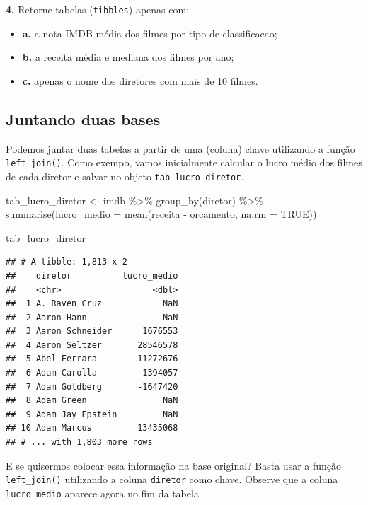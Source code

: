 \documentclass[
]{book}
\newenvironment{Shaded}{\begin{snugshade}}{\end{snugshade}}
\newcommand{\AttributeTok}[1]{\textcolor[rgb]{0.77,0.63,0.00}{#1}}
\newcommand{\ConstantTok}[1]{\textcolor[rgb]{0.00,0.00,0.00}{#1}}
\newcommand{\FunctionTok}[1]{\textcolor[rgb]{0.00,0.00,0.00}{#1}}
\newcommand{\NormalTok}[1]{#1}
\newcommand{\OtherTok}[1]{\textcolor[rgb]{0.56,0.35,0.01}{#1}}
\newcommand{\SpecialCharTok}[1]{\textcolor[rgb]{0.00,0.00,0.00}{#1}}
\begin{document}
\textbf{4.} Retorne tabelas (\texttt{tibbles}) apenas com:

\begin{itemize}
\item
  \textbf{a.} a nota IMDB média dos filmes por tipo de classificacao;
\item
  \textbf{b.} a receita média e mediana dos filmes por ano;
\item
  \textbf{c.} apenas o nome dos diretores com mais de 10 filmes.
\end{itemize}

\hypertarget{juntando-duas-bases}{%
\subsection{Juntando duas bases}\label{juntando-duas-bases}}

Podemos juntar duas tabelas a partir de uma (coluna) chave utilizando a função \texttt{left\_join()}. Como exempo, vamos inicialmente calcular o lucro médio dos filmes de cada diretor e salvar no objeto \texttt{tab\_lucro\_diretor}.

\begin{Shaded}
\begin{Highlighting}[]
\NormalTok{tab\_lucro\_diretor }\OtherTok{\textless{}{-}}\NormalTok{ imdb }\SpecialCharTok{\%\textgreater{}\%}
  \FunctionTok{group\_by}\NormalTok{(diretor) }\SpecialCharTok{\%\textgreater{}\%} 
  \FunctionTok{summarise}\NormalTok{(}\AttributeTok{lucro\_medio =} \FunctionTok{mean}\NormalTok{(receita }\SpecialCharTok{{-}}\NormalTok{ orcamento, }\AttributeTok{na.rm =} \ConstantTok{TRUE}\NormalTok{))}

\NormalTok{tab\_lucro\_diretor}
\end{Highlighting}
\end{Shaded}

\begin{verbatim}
## # A tibble: 1,813 x 2
##    diretor          lucro_medio
##    <chr>                  <dbl>
##  1 A. Raven Cruz            NaN
##  2 Aaron Hann               NaN
##  3 Aaron Schneider      1676553
##  4 Aaron Seltzer       28546578
##  5 Abel Ferrara       -11272676
##  6 Adam Carolla        -1394057
##  7 Adam Goldberg       -1647420
##  8 Adam Green               NaN
##  9 Adam Jay Epstein         NaN
## 10 Adam Marcus         13435068
## # ... with 1,803 more rows
\end{verbatim}

E se quisermos colocar essa informação na base original? Basta usar a função \texttt{left\_join()} utilizando a coluna \texttt{diretor} como chave. Observe que a coluna \texttt{lucro\_medio} aparece agora no fim da tabela.
\end{document}
